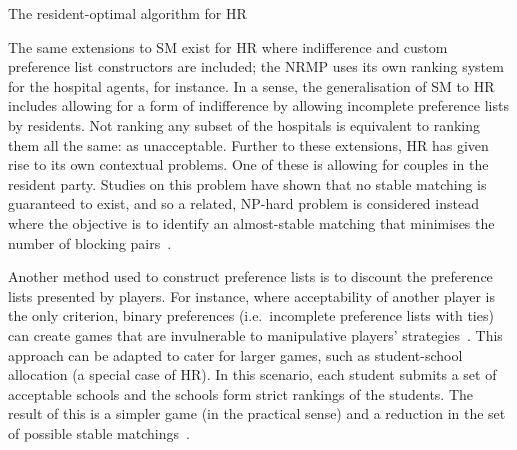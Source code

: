 \balg%
\caption{The resident-optimal algorithm for HR}\label{alg:hospital_resident}

\vspace{1em}


\ealg%

The same extensions to SM exist for HR where indifference and custom preference
list constructors are included; the NRMP uses its own ranking system for the
hospital agents, for instance. In a sense, the generalisation of SM to HR
includes allowing for a form of indifference by allowing incomplete preference
lists by residents. Not ranking any subset of the hospitals is equivalent to
ranking them all the same: as unacceptable. Further to these extensions, HR has
given rise to its own contextual problems. One of these is allowing for
couples in the resident party. Studies on this problem have shown that no stable
matching is guaranteed to exist, and so a related, NP-hard problem is considered
instead where the objective is to identify an almost-stable matching that
minimises the number of blocking pairs~\cite{Manlove2016}.

Another method used to construct preference lists is to discount the preference
lists presented by players. For instance, where acceptability of another player
is the only criterion, binary preferences (i.e.\ incomplete preference lists
with ties) can create games that are invulnerable to manipulative players'
strategies~\cite{Bogomolnaia2004}. This approach can be adapted to cater for
larger games, such as student-school allocation (a special case of HR). In this
scenario, each student submits a set of acceptable schools and the schools form
strict rankings of the students. The result of this is a simpler game (in the
practical sense) and a reduction in the set of possible stable
matchings~\cite{Haeringer2014,Haeringer2019}.
